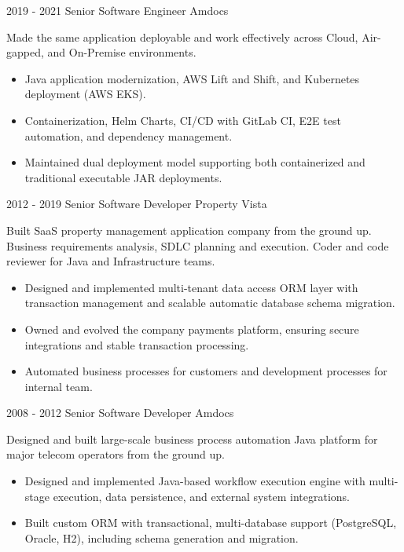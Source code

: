 \documentclass[10pt,a4paper,sans]{moderncv}   %
\begin{document}
\cventry
  {2019 - 2021}
  {Senior Software Engineer}
  {Amdocs}
  {}{}
  {
    \vspace{0.5em}
    Made the same application deployable and work effectively across Cloud, Air-gapped, and On-Premise environments.
    \begin{itemize}
      \item Java application modernization, AWS Lift and Shift, and Kubernetes deployment (AWS EKS).
      \item Containerization, Helm Charts, CI/CD with GitLab CI, E2E test automation, and dependency management.
      \item Maintained dual deployment model supporting both containerized and traditional executable JAR deployments.
    \end{itemize}
    \vspace{1em}
  }

\cventry
  {2012 - 2019}
  {Senior Software Developer}
  {Property Vista}
  {}{}
  {
    \vspace{0.5em}
    Built SaaS property management application company from the ground up. Business requirements analysis, SDLC planning and execution. Coder and code reviewer for Java and Infrastructure teams.
    \begin{itemize}
      \item Designed and implemented multi-tenant data access ORM layer with transaction management and scalable automatic database schema migration.
      \item Owned and evolved the company payments platform, ensuring secure integrations and stable transaction processing.
      \item Automated business processes for customers and development processes for internal team.
    \end{itemize}
    \vspace{1em}
  }

\cventry
  {2008 - 2012}
  {Senior Software Developer}
  {Amdocs}
  {}{}
  {
    \vspace{0.5em}
    Designed and built large-scale business process automation Java platform for major telecom operators from the ground up.
    \begin{itemize}
      \item Designed and implemented Java-based workflow execution engine with multi-stage execution, data persistence, and external system integrations.
      \item Built custom ORM with transactional, multi-database support (PostgreSQL, Oracle, H2), including schema generation and migration.
    \end{itemize}
    \vspace{1em}
  }
\end{document}
